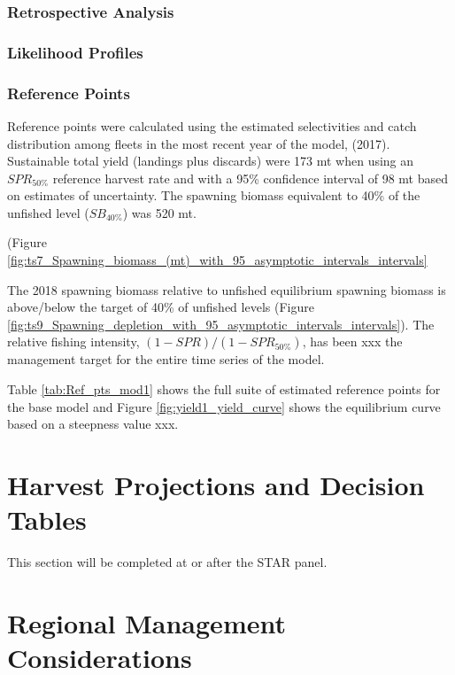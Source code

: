 \documentclass[12pt,]{article}
\begin{document}
\subsubsection{Retrospective Analysis}\label{retrospective-analysis}

\subsubsection{Likelihood Profiles}\label{likelihood-profiles}

\subsubsection{Reference Points}\label{reference-points-1}

Reference points were calculated using the estimated selectivities and
catch distribution among fleets in the most recent year of the model,
(2017). Sustainable total yield (landings plus discards) were 173 mt
when using an \(SPR_{50\%}\) reference harvest rate and with a 95\%
confidence interval of 98 mt based on estimates of uncertainty. The
spawning biomass equivalent to 40\% of the unfished level
(\(SB_{40\%}\)) was 520 mt.

(Figure
\ref{fig:ts7_Spawning_biomass_(mt)_with_95_asymptotic_intervals_intervals}

The 2018 spawning biomass relative to unfished equilibrium spawning
biomass is above/below the target of 40\% of unfished levels (Figure
\ref{fig:ts9_Spawning_depletion_with_95_asymptotic_intervals_intervals}).
The relative fishing intensity, \((1-SPR)/(1-SPR_{50\%})\), has been xxx
the management target for the entire time series of the model.

Table \ref{tab:Ref_pts_mod1} shows the full suite of estimated reference
points for the base model and Figure \ref{fig:yield1_yield_curve} shows
the equilibrium curve based on a steepness value xxx.

\section{Harvest Projections and Decision
Tables}\label{harvest-projections-and-decision-tables}

This section will be completed at or after the STAR panel.

\section{Regional Management
Considerations}\label{regional-management-considerations}
\end{document}
